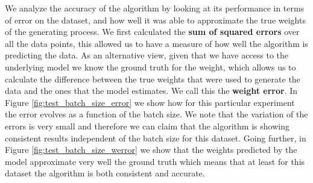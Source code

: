 \documentclass[11pt,a4paper]{article}
\begin{document}
We analyze the accuracy of the algorithm by looking at its performance in terms
of error on the dataset, and how well it was able to approximate the true weights
of the generating process.
We first calculated the \textbf{sum of squared errors} over all the data points, 
this allowed us to have a measure of how well the algorithm is predicting the data. 
As an alternative view, given that we have access to the underlying model we know the 
ground truth  for the weight, which allows us to calculate the difference between 
the true weights that were used to generate the data and the ones that
the model estimates. We call this the \textbf{weight error}. In Figure
\ref{fig:test_batch_size_error} we show how for this particular experiment the
error evolves as a function of the batch size. We note that the variation of the errors
is very small and therefore we can claim that the algorithm is showing consistent
results independent of the batch size for this dataset. Going further, in Figure 
\ref{fig:test_batch_size_werror} we show that the weights predicted by the model
approximate very well the ground truth which means that at least
for this dataset the algorithm is both consistent and accurate. 
\end{document}

